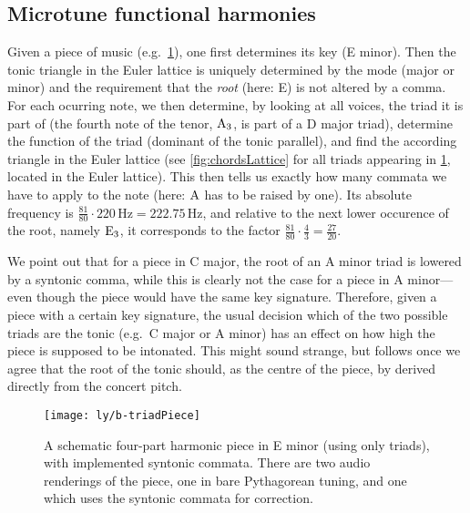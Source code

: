 \documentclass[british,11pt]{scrartcl}
\begin{document}
\subsection{Microtune functional harmonies}

Given a piece of music (e.g.\ \cref{fig:triadPiece}), one first determines its
key (E minor).  Then the tonic triangle in the Euler lattice is uniquely
determined by the mode (major or minor) and the requirement that the \emph{root}
(here: E) is not altered by a comma. For each ocurring note, we then determine,
by looking at all voices, the triad it is part of (the fourth note of the tenor,
$\text{A}_3$, is part of a D major triad), determine the function of the triad
(dominant of the tonic parallel), and find the according triangle in the Euler
lattice (see \cref{fig:chordsLattice} for all triads appearing in
\cref{fig:triadPiece}, located in the Euler lattice). This then tells us exactly
how many commata we have to apply to the note (here: $\text{A}$ has to be raised by
one). Its absolute frequency is
$\frac{81}{80}\cdot 220\,\text{Hz}=222.75\,\text{Hz}$, and relative to the next
lower occurence of the root, namely $\text{E}_3$, it corresponds to the factor
$\frac{81}{80}\cdot \frac{4}{3}=\frac{27}{20}$.

We point out that for a piece in C major, the root of an A minor triad is
lowered by a syntonic comma, while this is clearly not the case for a piece in A
minor—even though the piece would have the same key signature. Therefore, given
a piece with a certain key signature, the usual decision which of the two
possible triads are the tonic (e.g.\ C major or A minor) has an effect on how
high the piece is supposed to be intonated.  This might sound strange, but
follows once we agree that the root of the tonic should, as the centre of the
piece, by derived directly from the concert pitch.

\begin{figure}
  \centering
  \texttt{[image: ly/b-triadPiece]}
  \caption{A schematic four-part harmonic piece in E minor (using only triads),
    with im\-ple\-men\-ted syntonic commata.  There are two audio renderings of
    the piece, one in bare Pythagorean tuning, and one which uses the syntonic
    commata for correction.}\label{fig:triadPiece}
\end{figure}
\end{document}
